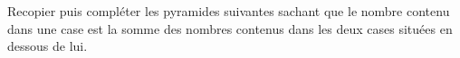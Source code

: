 
\begin{exercice}\label{exo2smath-0228}

Recopier puis compléter les pyramides suivantes sachant que le nombre contenu dans une case est la somme des nombres contenus dans les deux cases situées en dessous de lui.

\begin{multicols}{2}
\begin{center}
   
\end{center}

\columnbreak

\begin{center}
   
\end{center}
\end{multicols}


\end{exercice}

